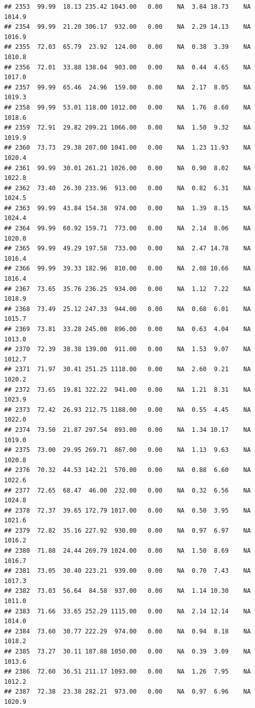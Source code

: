 \documentclass{article}\usepackage{graphicx, color}
\makeatletter
\newenvironment{kframe}{%
 \def\at@end@of@kframe{}%
 \ifinner\ifhmode%
  \def\at@end@of@kframe{\end{minipage}}%
  \begin{minipage}{\columnwidth}%
 \fi\fi%
 \def\FrameCommand##1{\hskip\@totalleftmargin \hskip-\fboxsep
 \colorbox{shadecolor}{##1}\hskip-\fboxsep
     \hskip-\linewidth \hskip-\@totalleftmargin \hskip\columnwidth}%
 \MakeFramed {\advance\hsize-\width
   \@totalleftmargin\z@ \linewidth\hsize
   \@setminipage}}%
 {\par\unskip\endMakeFramed%
 \at@end@of@kframe}
\newenvironment{knitrout}{}{} %
\makeatother
\begin{document}
\begin{knitrout}
\begin{kframe}
\begin{verbatim}
## 2353  99.99  18.13 235.42 1043.00   0.00    NA  3.84 18.73    NA 1014.9
## 2354  99.99  21.20 306.17  932.00   0.00    NA  2.29 14.13    NA 1016.9
## 2355  72.03  65.79  23.92  124.00   0.00    NA  0.38  3.39    NA 1010.8
## 2356  72.01  33.88 138.04  903.00   0.00    NA  0.44  4.65    NA 1017.0
## 2357  99.99  65.46  24.96  159.00   0.00    NA  2.17  8.05    NA 1019.3
## 2358  99.99  53.01 118.00 1012.00   0.00    NA  1.76  8.60    NA 1018.6
## 2359  72.91  29.82 209.21 1066.00   0.00    NA  1.50  9.32    NA 1019.9
## 2360  73.73  29.38 207.00 1041.00   0.00    NA  1.23 11.93    NA 1020.4
## 2361  99.99  30.01 261.21 1026.00   0.00    NA  0.90  8.02    NA 1022.8
## 2362  73.40  26.30 233.96  913.00   0.00    NA  0.82  6.31    NA 1024.5
## 2363  99.99  43.84 154.38  974.00   0.00    NA  1.39  8.15    NA 1024.4
## 2364  99.99  60.92 159.71  773.00   0.00    NA  2.14  8.06    NA 1020.0
## 2365  99.99  49.29 197.58  733.00   0.00    NA  2.47 14.78    NA 1016.4
## 2366  99.99  39.33 182.96  810.00   0.00    NA  2.08 10.66    NA 1016.4
## 2367  73.65  35.76 236.25  934.00   0.00    NA  1.12  7.22    NA 1018.9
## 2368  73.49  25.12 247.33  944.00   0.00    NA  0.68  6.01    NA 1015.7
## 2369  73.81  33.28 245.00  896.00   0.00    NA  0.63  4.04    NA 1013.0
## 2370  72.39  38.38 139.00  911.00   0.00    NA  1.53  9.07    NA 1012.7
## 2371  71.97  30.41 251.25 1118.00   0.00    NA  2.60  9.21    NA 1020.2
## 2372  73.65  19.81 322.22  941.00   0.00    NA  1.21  8.31    NA 1023.9
## 2373  72.42  26.93 212.75 1188.00   0.00    NA  0.55  4.45    NA 1022.0
## 2374  73.50  21.87 297.54  893.00   0.00    NA  1.34 10.17    NA 1019.0
## 2375  73.00  29.95 269.71  867.00   0.00    NA  1.13  9.63    NA 1020.8
## 2376  70.32  44.53 142.21  570.00   0.00    NA  0.88  6.60    NA 1022.6
## 2377  72.65  68.47  46.00  232.00   0.00    NA  0.32  6.56    NA 1024.8
## 2378  72.37  39.65 172.79 1017.00   0.00    NA  0.50  3.95    NA 1021.6
## 2379  72.82  35.16 227.92  930.00   0.00    NA  0.97  6.97    NA 1016.2
## 2380  71.88  24.44 269.79 1024.00   0.00    NA  1.50  8.69    NA 1016.7
## 2381  73.05  30.40 223.21  939.00   0.00    NA  0.70  7.43    NA 1017.3
## 2382  73.03  56.64  84.58  937.00   0.00    NA  1.14 10.30    NA 1011.0
## 2383  71.66  33.65 252.29 1115.00   0.00    NA  2.14 12.14    NA 1014.0
## 2384  73.60  30.77 222.29  974.00   0.00    NA  0.94  8.18    NA 1018.2
## 2385  73.27  30.11 187.88 1050.00   0.00    NA  0.39  3.09    NA 1013.6
## 2386  72.60  36.51 211.17 1093.00   0.00    NA  1.26  7.95    NA 1012.2
## 2387  72.38  23.38 282.21  973.00   0.00    NA  0.97  6.96    NA 1020.9

\end{verbatim}
\end{kframe}
\end{knitrout}
\end{document}
